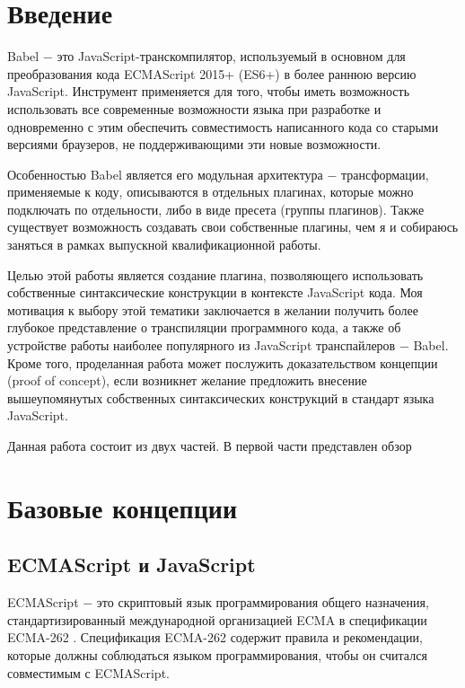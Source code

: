 \documentclass[14pt, a4paper]{article}
\begin{document}

\tableofcontents
\pagebreak

\section*{Введение}
Babel $-$ это JavaScript-транскомпилятор, используемый в основном для преобразования кода ECMAScript 
2015+ (ES6+) в более раннюю версию JavaScript. Инструмент применяется для того, чтобы иметь 
возможность использовать все современные возможности языка при разработке и одновременно с этим 
обеспечить совместимость написанного кода со старыми версиями браузеров, не поддерживающими эти новые 
возможности.

Особенностью Babel является его модульная архитектура $-$ трансформации, применяемые к коду, 
описываются в отдельных плагинах, которые можно подключать по отдельности, либо в виде пресета 
(группы плагинов). Также существует возможность создавать свои собственные плагины, чем я и собираюсь
 заняться в рамках выпускной квалификационной работы.

Целью этой работы является создание плагина, позволяющего использовать собственные синтаксические 
конструкции в контексте JavaScript кода. Моя мотивация к выбору этой тематики заключается в желании 
получить более глубокое представление о транспиляции программного кода, а также об устройстве работы 
наиболее популярного из JavaScript транспайлеров $-$ Babel. Кроме того, проделанная работа может 
послужить доказательством концепции (proof of concept), если возникнет желание предложить внесение 
вышеупомянутых собственных синтаксических конструкций в стандарт языка JavaScript.

Данная работа состоит из двух частей. В первой части представлен обзор

\pagebreak
\section{Базовые концепции}
\subsection{ECMAScript и JavaScript}
ECMAScript $-$ это скриптовый язык программирования общего назначения, стандартизированный международной 
организацией ECMA в спецификации ECMA-262 \cite{ecma-262}. Спецификация ECMA-262 содержит правила и рекомендации, 
которые должны соблюдаться языком программирования, чтобы он считался совместимым с ECMAScript.
\end{document}
